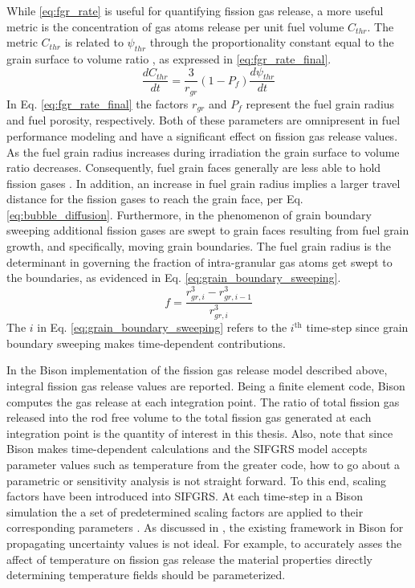 While \ref{eq:fgr_rate} is useful for quantifying fission gas release, a more useful metric is the concentration of gas atoms release per unit fuel volume $C_{thr}$. The metric $C_{thr}$ is related to $\psi_{thr}$ through the proportionality constant equal to the grain surface to volume ratio \cite{Pastore2}, as expressed in \ref{eq:fgr_rate_final}.
\begin{equation}
\label{eq:fgr_rate_final}
 \frac{dC_{thr}}{dt} = \frac{3}{r_{gr}}\left(1 - P_f\right) \frac{d\psi_{thr}}{dt}
\end{equation} 
In Eq. \ref{eq:fgr_rate_final} the factors $r_{gr}$ and $P_f$ represent the fuel grain radius and fuel porosity, respectively. Both of these parameters are omnipresent in fuel performance modeling and have a significant effect on fission gas release values. As the fuel grain radius increases during irradiation the grain surface to volume ratio decreases. Consequently, fuel grain faces generally are less able to hold fission gases \cite{Pastore1}. In addition, an increase in fuel grain radius implies a larger travel distance for the fission gases to reach the grain face, per Eq. \ref{eq:bubble_diffusion}. Furthermore, in the phenomenon of grain boundary sweeping additional fission gases are swept to grain faces resulting from fuel grain growth, and specifically, moving grain boundaries. The fuel grain radius is the determinant in governing the fraction of intra-granular gas atoms get swept to the boundaries, as evidenced in Eq. \ref{eq:grain_boundary_sweeping}.
\begin{equation}
\label{eq:grain_boundary_sweeping}
 f = \frac{r_{gr,i}^3 - r_{gr,i-1}^3}{r_{gr,i}^3}
\end{equation}    
The $i$ in Eq. \ref{eq:grain_boundary_sweeping} refers to the $i^{\mbox{th}}$ time-step since grain boundary sweeping makes time-dependent contributions. 

In the Bison implementation of the fission gas release model described above, integral fission gas release values are reported. Being a finite element code, Bison computes the gas release at each integration point. The ratio of  total fission gas released into the rod free volume to the total fission gas generated at each integration point is the quantity of interest in this thesis. Also, note that since Bison makes time-dependent calculations and the \ac{SIFGRS} model accepts parameter values such as temperature from the greater code, how to go about a parametric or sensitivity analysis is not straight forward. To this end, scaling factors have been introduced into \ac{SIFGRS}. At each time-step in a Bison simulation the a set of predetermined scaling factors are applied to their corresponding parameters \cite{Pastore2}. As discussed in \cite{Pastore2}, the existing framework in Bison for propagating uncertainty values is not ideal. For example, to accurately asses the affect of temperature on fission gas release the material properties directly determining temperature fields should be parameterized.    

